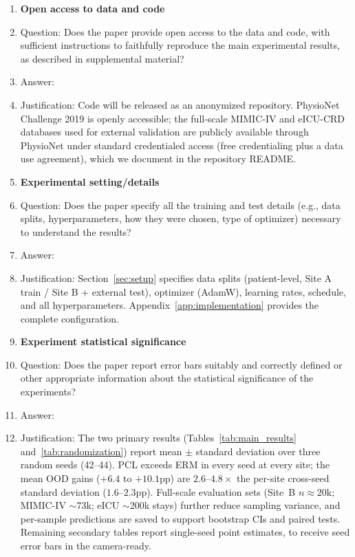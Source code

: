 \documentclass{article}
\begin{document}
\begin{enumerate}
\item {\bf Open access to data and code}
    \item[] Question: Does the paper provide open access to the data and code, with sufficient instructions to faithfully reproduce the main experimental results, as described in supplemental material?
    \item[] Answer: \answerYes{}
    \item[] Justification: Code will be released as an anonymized repository. PhysioNet Challenge 2019 is openly accessible; the full-scale MIMIC-IV and eICU-CRD databases used for external validation are publicly available through PhysioNet under standard credentialed access (free credentialing plus a data use agreement), which we document in the repository README.

\item {\bf Experimental setting/details}
    \item[] Question: Does the paper specify all the training and test details (e.g., data splits, hyperparameters, how they were chosen, type of optimizer) necessary to understand the results?
    \item[] Answer: \answerYes{}
    \item[] Justification: Section~\ref{sec:setup} specifies data splits (patient-level, Site A train / Site B + external test), optimizer (AdamW), learning rates, schedule, and all hyperparameters. Appendix~\ref{app:implementation} provides the complete configuration.

\item {\bf Experiment statistical significance}
    \item[] Question: Does the paper report error bars suitably and correctly defined or other appropriate information about the statistical significance of the experiments?
    \item[] Answer: \answerYes{}
    \item[] Justification: The two primary results (Tables~\ref{tab:main_results} and~\ref{tab:randomization}) report mean $\pm$ standard deviation over three random seeds (42--44). PCL exceeds ERM in every seed at every site; the mean OOD gains ($+6.4$ to $+10.1$pp) are $2.6$--$4.8\times$ the per-site cross-seed standard deviation ($1.6$--$2.3$pp). Full-scale evaluation sets (Site~B $n{\approx}20$k; MIMIC-IV ${\sim}$73k; eICU ${\sim}$200k stays) further reduce sampling variance, and per-sample predictions are saved to support bootstrap CIs and paired tests. Remaining secondary tables report single-seed point estimates, to receive seed error bars in the camera-ready.


\end{enumerate}
\end{document}

